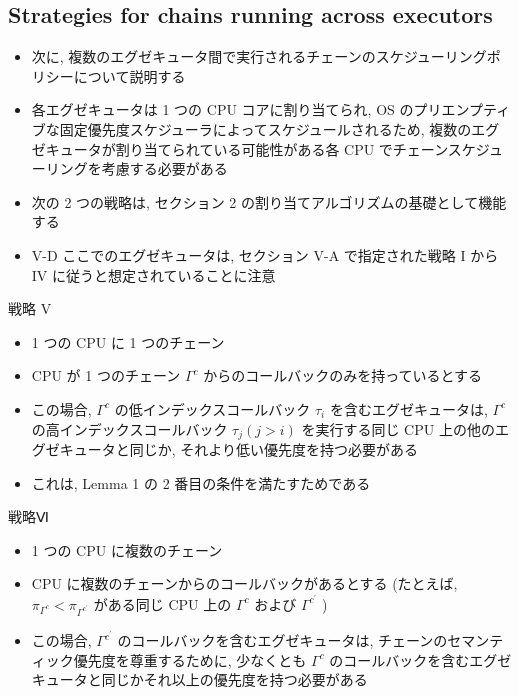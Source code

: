 \subsection{Strategies for chains running across executors}
\label{ssec: strategies for chains running across executors}

\begin{frame}{}
    \begin{itemize}
        \item 次に, 複数のエグゼキュータ間で実行されるチェーンのスケジューリングポリシーについて説明する
        \item 各エグゼキュータは 1 つの CPU コアに割り当てられ, OS のプリエンプティブな固定優先度スケジューラによってスケジュールされるため, 複数のエグゼキュータが割り当てられている可能性がある各 CPU でチェーンスケジューリングを考慮する必要がある
        \item 次の 2 つの戦略は, セクション 2 の割り当てアルゴリズムの基礎として機能する
        \item V-D ここでのエグゼキュータは, セクション V-A で指定された戦略 I から IV に従うと想定されていることに注意
    \end{itemize}
\end{frame}

\begin{frame}{戦略 V}
    \begin{itemize}
        \item 1 つの CPU に 1 つのチェーン
        \item CPU が 1 つのチェーン $\Gamma^{c}$ からのコールバックのみを持っているとする
        \item この場合, $\Gamma^{c}$ の低インデックスコールバック $\tau_{i}$ を含むエグゼキュータは, $\Gamma^{c}$ の高インデックスコールバック $\tau_{j}(j>i)$ を実行する同じ CPU 上の他のエグゼキュータと同じか, それより低い優先度を持つ必要がある
        \item これは, Lemma 1 の 2 番目の条件を満たすためである
    \end{itemize}
\end{frame}

\begin{frame}{戦略Ⅵ}
    \begin{itemize}
        \item 1 つの CPU に複数のチェーン
        \item CPU に複数のチェーンからのコールバックがあるとする (たとえば,  $\pi_{\Gamma^{c}}<\pi_{\Gamma^{c^{\prime}}}$ がある同じ CPU 上の $\Gamma^{c}$ および $\Gamma^{c^{\prime}}$ )
        \item この場合, $\Gamma^{c^{\prime}}$ のコールバックを含むエグゼキュータは, チェーンのセマンティック優先度を尊重するために, 少なくとも $\Gamma^{c}$ のコールバックを含むエグゼキュータと同じかそれ以上の優先度を持つ必要がある
    \end{itemize}
\end{frame}


